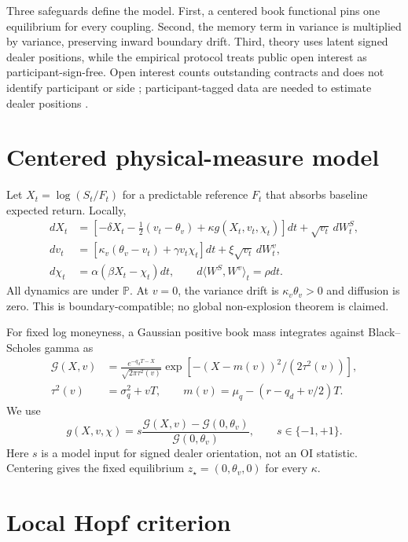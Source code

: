 \documentclass[sigconf,review,anonymous]{acmart}
\begin{document}
Three safeguards define the model. First, a
centered book functional pins one equilibrium for every coupling. Second, the
memory term in variance is multiplied by variance, preserving inward boundary
drift. Third, theory uses latent signed dealer positions, while the empirical
protocol treats public open interest as participant-sign-free. Open interest counts
outstanding contracts and does not identify participant or side
\citep{oicopeninterest}; participant-tagged data are needed to estimate dealer
positions \citep{vasquez2025zerodte}.

\section{Centered physical-measure model}

Let $X_t=\log(S_t/F_t)$ for a predictable reference $F_t$ that absorbs
baseline expected return. Locally,
\begin{align}
dX_t&=[-\delta X_t-\tfrac12(v_t-\theta_v)+\kappa g(X_t,v_t,\chi_t)]dt
       +\sqrt{v_t}\,dW_t^S,\label{eq:x}\\
dv_t&=[\kappa_v(\theta_v-v_t)+\gamma v_t\chi_t]dt
       +\xi\sqrt{v_t}\,dW_t^v,\label{eq:v}\\
d\chi_t&=\alpha(\beta X_t-\chi_t)dt,
\qquad d\langle W^S,W^v\rangle_t=\rho dt.\label{eq:chi}
\end{align}
All dynamics are under $\mathbb P$. At $v=0$, the variance drift is
$\kappa_v\theta_v>0$ and diffusion is zero. This is boundary-compatible; no
global non-explosion theorem is claimed.

For fixed log moneyness, a Gaussian positive book mass integrates against
Black--Scholes gamma as
\begin{align}
\mathcal G(X,v)&=\frac{e^{-q_dT-X}}{\sqrt{2\pi\tau^2(v)}}
\exp[-(X-m(v))^2/(2\tau^2(v))],\nonumber\\
\tau^2(v)&=\sigma_q^2+vT,\qquad
m(v)=\mu_q-(r-q_d+v/2)T.\label{eq:raw}
\end{align}
We use
\begin{equation}
g(X,v,\chi)=s\frac{\mathcal G(X,v)-\mathcal G(0,\theta_v)}
{\mathcal G(0,\theta_v)},\qquad s\in\{-1,+1\}.\label{eq:centered}
\end{equation}
Here $s$ is a model input for signed dealer orientation, not an OI statistic.
Centering gives the fixed equilibrium $z_\star=(0,\theta_v,0)$ for every
$\kappa$.

\section{Local Hopf criterion}
\end{document}
